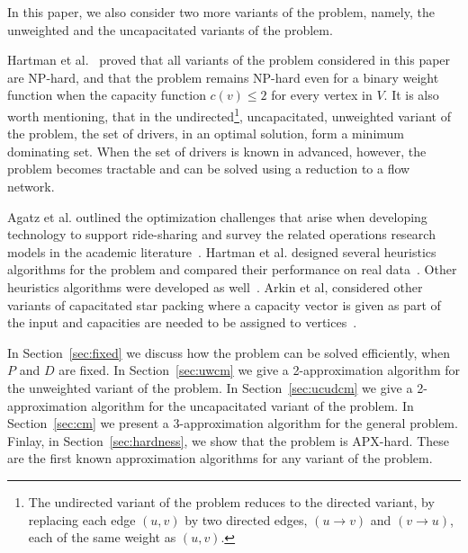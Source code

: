 In this paper, we also consider two more variants of the problem, namely, 
the unweighted and the uncapacitated variants of the problem. 
  
Hartman et al.~\cite{hartman2013optimal} proved that all variants of the
\emph{\CARPOOL{}} problem considered in this paper are NP-hard,
and that the problem remains NP-hard even for a binary weight function when
the capacity function $c(v) \leq 2$ for every vertex in $V$.
It is also worth mentioning, that in the undirected\footnote{
The undirected variant of the problem reduces to the directed variant,
by replacing each edge $(u,v)$ by two directed edges,
$(u \rightarrow v)$ and $(v \rightarrow u)$,
each of the same weight as $(u,v)$.}, uncapacitated, unweighted
variant of the problem, the set of drivers, in an optimal solution,
form a minimum dominating set.
When the set of drivers is known in advanced, however, the problem becomes
tractable and can be solved using a reduction to a flow network.

Agatz et al. outlined the optimization challenges that arise 
when developing technology to support ride-sharing and survey the
related operations research models in the academic literature~\cite{agatz2012optimization}.  
Hartman et al. designed several heuristics algorithms for the 
\CARPOOL{} problem and compared 
their performance on real data~\cite{hartman2014theory}.
Other heuristics algorithms were developed as well~\cite{knapen2014exploiting}.
Arkin et al, considered other variants of capacitated star packing where
a capacity vector is given as part of the input and 
capacities are needed to be assigned to vertices~\cite{arkin2004approximations}.  


In Section~\ref{sec:fixed} we discuss how the problem can be solved efficiently,
when $P$ and $D$ are fixed.
In Section~\ref{sec:uwcm} we give a 2-approximation algorithm for the
unweighted variant of the problem.
In Section~\ref{sec:ucudcm} we give a 2-approximation algorithm
for the uncapacitated variant of the problem. 
In Section~\ref{sec:cm} we present a 3-approximation
algorithm for the general problem. 
Finlay, in Section~\ref{sec:hardness}, we show that the problem is APX-hard.
These are the first known approximation algorithms for any variant of the problem.

